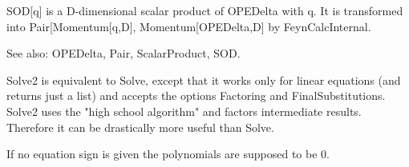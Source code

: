 


SOD[q] is a D-dimensional scalar product of OPEDelta with q. It is transformed into Pair[Momentum[q,D], Momentum[OPEDelta,D] by
  FeynCalcInternal.

See also:  OPEDelta, Pair, ScalarProduct, SOD.





\dispSFoutmath{
\{ \}
}





Solve2 is equivalent to Solve, except that it works only for linear equations (and returns just a list) and accepts the options Factoring
  and FinalSubstitutions. Solve2 uses the "high school algorithm" and factors intermediate results. Therefore it can be drastically more
  useful than Solve.






If no equation sign is given the polynomials are supposed to be 0.



